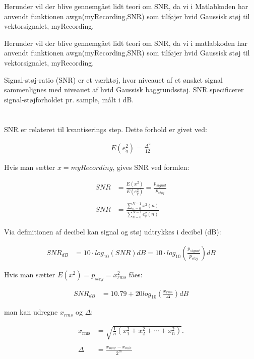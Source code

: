 \documentclass[a4paper]{report}
\begin{document}
Herunder vil der blive gennemgået lidt teori om SNR, da vi i Matlabkoden har anvendt funktionen awgn(myRecording,SNR) som tilføjer hvid Gaussisk støj til vektorsignalet, myRecording. 

Herunder vil der blive gennemgået lidt teori om SNR, da vi i matlabkoden har anvendt funktionen awgn(myRecording,SNR) som tilføjer hvid Gaussisk støj til vektorsignalet, myRecording. 

Signal-støj-ratio (SNR) er et værktøj, hvor niveauet af et ønsket signal sammenlignes med niveauet af hvid Gaussisk baggrundsstøj. SNR specificerer signal-støjforholdet pr. sample, målt i dB.\\
\\
\\

SNR er relateret til kvantiserings step. Dette forhold er givet ved: 

\begin{align}
E(e_q^2) = \frac{\Delta^2}{12}
\end{align}

Hvis man sætter $x=myRecording$, gives SNR ved formlen: 

\begin{align}
SNR &= \frac{E(x^2)}{E(e_q^2)}=\frac{p_{signal}}{p_{støj}}\\
\\
SNR &= \frac{\sum\limits_{n=0}^{N-1} x^2(n)}{\sum\limits_{n=0}^{N-1} e_{q}^2(n)}
\end{align}

Via definitionen af ​​decibel kan signal og støj udtrykkes i decibel (dB): 

\begin{align}
SNR_{dB} &= 10 \cdot log_{10}(SNR) dB = 10 \cdot log_{10}(\frac{p_{signal}}{p_{støj}})dB
\end{align}

Hvis man sætter $E(x^2)=p_{støj}= x^2_{rms}$ fåes: 


\begin{align}
SNR_{dB} &= 10.79 + 20log_{10}(\frac{x_{rms}}{\Delta}) dB
\end{align}

man kan udregne $x_{rms}$ og $\Delta:$

\begin{align}
x_{\mathrm{rms}} &= {\sqrt {{\frac {1}{n}}\left(x_{1}^{2}+x_{2}^{2}+\cdots +x_{n}^{2}\right)}}.\\
\\
\Delta &= \frac{x_{max}-x_{min}}{2^m}
\end{align}
\end{document}
